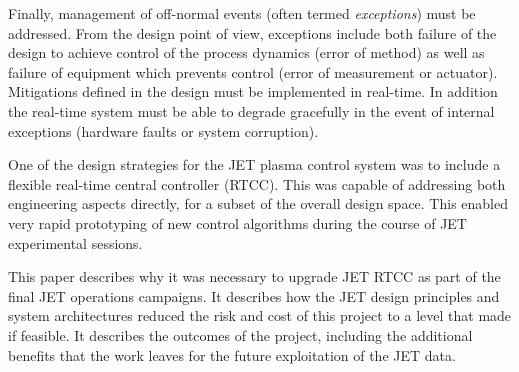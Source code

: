 \documentclass[preprint,12pt]{elsarticle}
\begin{document}
Finally, management of off-normal events (often termed {\em exceptions}) 
must be addressed.  From the design point of view, exceptions include both
failure of the design to achieve control of the process dynamics (error of method)
as well as failure of equipment which prevents control (error of measurement or actuator).
Mitigations defined in the design must be implemented in real-time.  In addition
the real-time system must be able to degrade gracefully in the event of internal
exceptions (hardware faults or system corruption).

One of the design strategies for the JET plasma control system was to include
a flexible real-time central controller (RTCC). This was capable of 
addressing both engineering aspects directly, for a subset of the overall
design space.  This enabled very rapid prototyping of new control
algorithms during the course of JET experimental sessions.

This paper describes why it was necessary to upgrade JET RTCC as part of the
final JET operations campaigns.  It describes how the JET design principles
and system architectures reduced the risk and cost of this project to a 
level that made if feasible.  It describes the outcomes of the project, 
including the additional benefits that the work leaves for the future
exploitation of the JET data.



%
%


\end{document}
